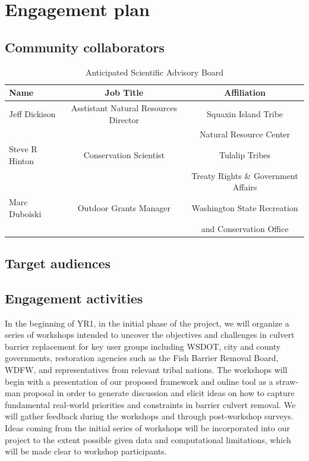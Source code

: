 \documentclass[12pt]{elsarticle}
\begin{document}
%
\section{Engagement plan \label{sec:engage}}
\subsection{Community collaborators} 

\begin{table}[h]
\caption{Anticipated Scientific Advisory Board \label{tab:sab}}
\centering
\begin{tabular}{lcc}\hline
 Name & Job Title & Affiliation  \\\hline
Jeff Dickison& Asstistant Natural Resources Director &  Squaxin Island Tribe\\
& & Natural Resource Center\\
\rowcolor[gray]{.9} Steve R Hinton &  Conservation Scientist&  Tulalip Tribes  \\
\rowcolor[gray]{.9}& &Treaty Rights \& Government Affairs\\
Marc Duboiski & Outdoor Grants Manager & Washington State Recreation\\
& & and Conservation Office\\\hline
\end{tabular}
\end{table}


\subsection{Target audiences}



\subsection{Engagement activities}

In the beginning of YR1, in the initial phase of the project, we will organize a series of workshops intended to uncover the objectives and challenges in culvert barrier replacement for key user groups including WSDOT, city and county governments, restoration agencies such as the Fish Barrier Removal Board, WDFW, and representatives from relevant tribal nations. The workshops will begin with a presentation of our proposed framework and online tool as a straw-man proposal in order to generate discussion and elicit ideas on how to capture fundamental real-world priorities and constraints in barrier culvert removal. We will gather feedback during the workshops and through post-workshop surveys. Ideas coming from the initial series of workshops will be incorporated into our project to the extent possible given data and computational limitations, which will be made clear to workshop participants.
\end{document}
